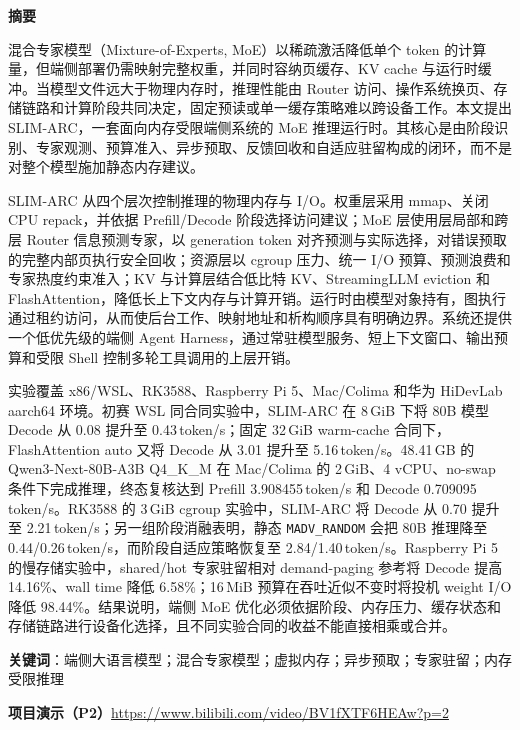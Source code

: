 \begin{center}
{\Large \kaishu \bfseries 摘\quad 要}
\end{center}

混合专家模型（Mixture-of-Experts, MoE）以稀疏激活降低单个 token 的计算量，但端侧部署仍需映射完整权重，并同时容纳页缓存、KV cache 与运行时缓冲。当模型文件远大于物理内存时，推理性能由 Router 访问、操作系统换页、存储链路和计算阶段共同决定，固定预读或单一缓存策略难以跨设备工作。本文提出 SLIM-ARC，一套面向内存受限端侧系统的 MoE 推理运行时。其核心是由阶段识别、专家观测、预算准入、异步预取、反馈回收和自适应驻留构成的闭环，而不是对整个模型施加静态内存建议。

SLIM-ARC 从四个层次控制推理的物理内存与 I/O。权重层采用 mmap、关闭 CPU repack，并依据 Prefill/Decode 阶段选择访问建议；MoE 层使用层局部和跨层 Router 信息预测专家，以 generation token 对齐预测与实际选择，对错误预取的完整内部页执行安全回收；资源层以 cgroup 压力、统一 I/O 预算、预测浪费和专家热度约束准入；KV 与计算层结合低比特 KV、StreamingLLM eviction 和 FlashAttention，降低长上下文内存与计算开销。运行时由模型对象持有，图执行通过租约访问，从而使后台工作、映射地址和析构顺序具有明确边界。系统还提供一个低优先级的端侧 Agent Harness，通过常驻模型服务、短上下文窗口、输出预算和受限 Shell 控制多轮工具调用的上层开销。

实验覆盖 x86/WSL、RK3588、Raspberry Pi 5、Mac/Colima 和华为 HiDevLab aarch64 环境。初赛 WSL 同合同实验中，SLIM-ARC 在 8\,GiB 下将 80B 模型 Decode 从 0.08 提升至 0.43\,token/s；固定 32\,GiB warm-cache 合同下，FlashAttention auto 又将 Decode 从 3.01 提升至 5.16\,token/s。48.41\,GB 的 Qwen3-Next-80B-A3B Q4\_K\_M 在 Mac/Colima 的 2\,GiB、4 vCPU、no-swap 条件下完成推理，终态复核达到 Prefill 3.908455\,token/s 和 Decode 0.709095\,token/s。RK3588 的 3\,GiB cgroup 实验中，SLIM-ARC 将 Decode 从 0.70 提升至 2.21\,token/s；另一组阶段消融表明，静态 \texttt{MADV\_RANDOM} 会把 80B 推理降至 0.44/0.26\,token/s，而阶段自适应策略恢复至 2.84/1.40\,token/s。Raspberry Pi 5 的慢存储实验中，shared/hot 专家驻留相对 demand-paging 参考将 Decode 提高 14.16\%、wall time 降低 6.58\%；16\,MiB 预算在吞吐近似不变时将投机 weight I/O 降低 98.44\%。结果说明，端侧 MoE 优化必须依据阶段、内存压力、缓存状态和存储链路进行设备化选择，且不同实验合同的收益不能直接相乘或合并。

\vspace{1em}
\noindent\textbf{关键词}：端侧大语言模型；混合专家模型；虚拟内存；异步预取；专家驻留；内存受限推理

\vspace{1em}
\noindent\textbf{项目演示（P2）}\quad \url{https://www.bilibili.com/video/BV1fXTF6HEAw?p=2}
\newpage
